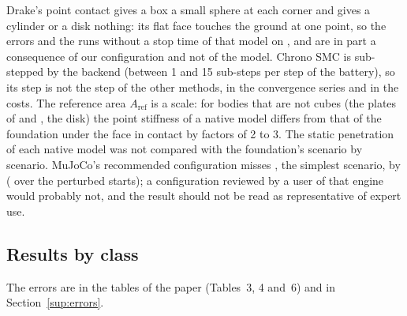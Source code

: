 Drake's point contact gives a box a small sphere at each corner and
gives a cylinder or a disk nothing: its flat face touches the ground at one point, so the errors
and the runs without a stop time of that model on ,  and  are
in part a consequence of our configuration and not of the model. Chrono SMC is sub-stepped by the
backend (between 1 and 15 sub-steps per step of the battery), so its step is not the step of the
other methods, in the convergence series and in the costs. The reference area $A_\mathrm{ref}$ is
a scale: for bodies that are not cubes (the plates of  and , the disk) the
point stiffness of a native model differs from that of the foundation under the face in contact by
factors of 2 to 3. The static penetration of each native model was not compared with the
foundation's scenario by scenario. MuJoCo's recommended configuration misses , the
simplest scenario, by  ( over the
perturbed starts); a configuration reviewed by a user of that engine would probably not, and the
result should not be read as representative of expert use.

\subsection{Results by class}

The errors are in the tables of the paper (Tables~3, 4 and~6) and in Section~\ref{sup:errors}.


